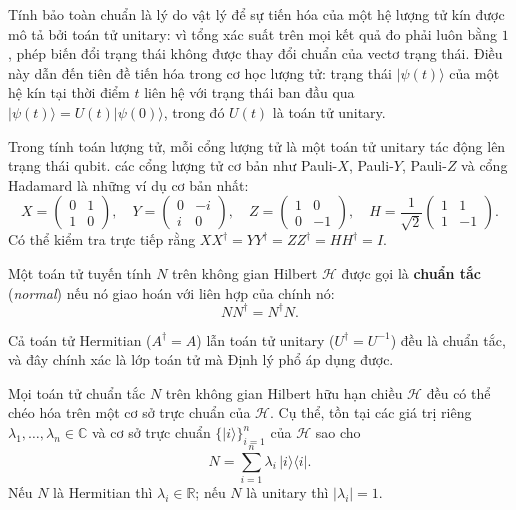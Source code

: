 \begin{remark}
Tính bảo toàn chuẩn là lý do vật lý để sự tiến hóa của một hệ lượng tử kín
được mô tả bởi toán tử unitary: vì tổng xác suất trên mọi kết quả đo phải luôn bằng
$1$, phép biến đổi trạng thái không được thay đổi chuẩn của vectơ trạng thái.
Điều này dẫn đến tiên đề tiến hóa trong cơ học lượng tử:
trạng thái $|\psi(t)\rangle$ của một hệ kín tại thời điểm $t$ liên hệ với trạng thái
ban đầu qua $|\psi(t)\rangle = U(t)|\psi(0)\rangle$, trong đó $U(t)$ là toán tử unitary.
\end{remark}

\begin{example} Trong tính toán lượng tử, mỗi cổng lượng tử là một toán tử unitary tác động lên
trạng thái qubit. các cổng lượng tử cơ bản như Pauli-$X$, Pauli-$Y$, Pauli-$Z$ và cổng Hadamard là những ví dụ cơ bản nhất:
$$X = \begin{pmatrix} 0 & 1 \\ 1 & 0 \end{pmatrix}, \quad
  Y = \begin{pmatrix} 0 & -i \\ i & 0 \end{pmatrix}, \quad
  Z = \begin{pmatrix} 1 & 0 \\ 0 & -1 \end{pmatrix}, \quad
  H = \frac{1}{\sqrt{2}}\begin{pmatrix} 1 & 1 \\ 1 & -1 \end{pmatrix}.$$
Có thể kiểm tra trực tiếp rằng $XX^\dagger = YY^\dagger = ZZ^\dagger = HH^\dagger = I$.
\end{example}

\begin{definition}
Một toán tử tuyến tính $N$ trên không gian Hilbert $\mathcal{H}$ được gọi là
\textbf{chuẩn tắc} (\textit{normal}) nếu nó giao hoán với liên hợp của chính nó:
$$N N^\dagger = N^\dagger N.$$
\end{definition}

\begin{remark}
Cả toán tử Hermitian ($A^\dagger = A$) lẫn toán tử unitary ($U^\dagger = U^{-1}$)
đều là chuẩn tắc, và đây chính xác là lớp toán tử mà Định lý phổ áp dụng được.
\end{remark}

\begin{theorem}
\label{thm:spectral}
Mọi toán tử chuẩn tắc $N$ trên không gian Hilbert hữu hạn chiều $\mathcal{H}$
đều có thể chéo hóa trên một cơ sở trực chuẩn của $\mathcal{H}$.
Cụ thể, tồn tại các giá trị riêng $\lambda_1, \dots, \lambda_n \in \mathbb{C}$
và cơ sở trực chuẩn $\{|i\rangle\}_{i=1}^n$ của $\mathcal{H}$ sao cho
$$N = \sum_{i=1}^n \lambda_i\, |i\rangle\langle i|.$$
Nếu $N$ là Hermitian thì $\lambda_i \in \mathbb{R}$;
nếu $N$ là unitary thì $|\lambda_i| = 1$.
\end{theorem}

